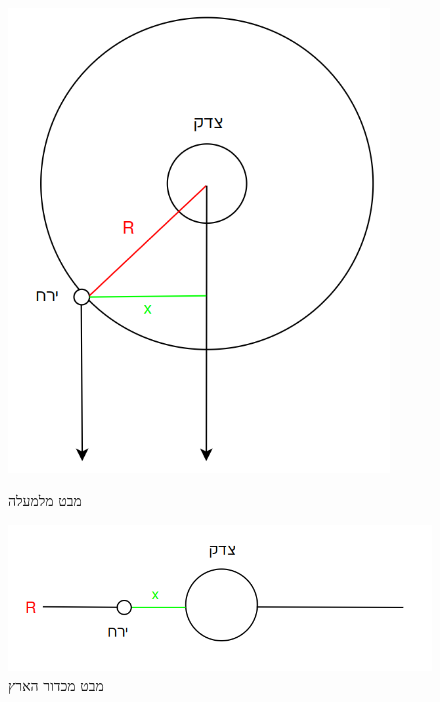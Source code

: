\documentclass[a4paper, 12pt]{article}
\begin{document}
    \begin{figure}[h!]
        \centering
        \begin{minipage}{0.4\textwidth}
            \centering
            \includegraphics[width=0.9\textwidth]{../assets/orbit_from_above_01.png}
            \caption{מבט מלמעלה}
        \end{minipage}\hfill
        \begin{minipage}{0.55\textwidth}
            \centering
            \includegraphics[width=\textwidth]{../assets/orbit_from_earth_01.png}
            \caption{מבט מכדור הארץ}
        \end{minipage}
    \end{figure}
\end{document}
